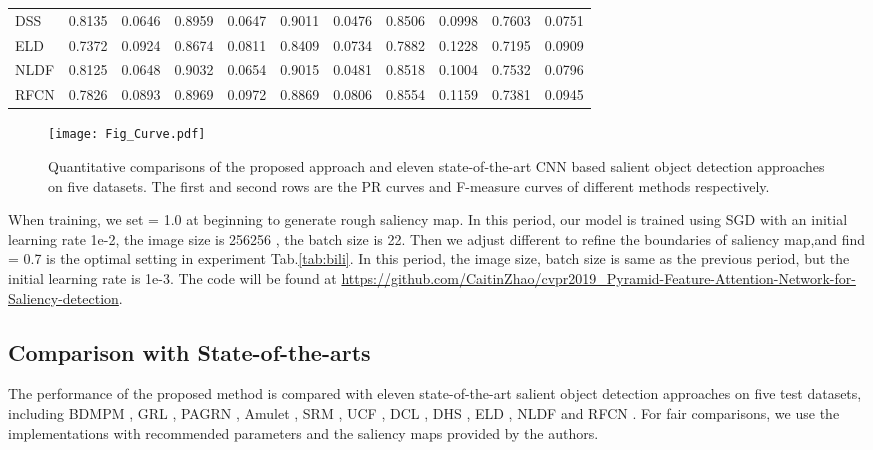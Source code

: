 \documentclass[10pt,twocolumn,letterpaper]{article}
\begin{document}
\begin{center}
\begin{table*}[t]
\begin{tabular}{| l | c | c | c | c | c | c | c | c | c | c |}
DSS\cite{dss}     & 0.8135 & 0.0646 & 0.8959 & 0.0647 & 0.9011 & 0.0476 & 0.8506 & 0.0998 & 0.7603 & 0.0751 \\
ELD\cite{eld}     & 0.7372 & 0.0924 & 0.8674 & 0.0811 & 0.8409 & 0.0734 & 0.7882 & 0.1228 & 0.7195 & 0.0909 \\
NLDF\cite{nldf}    & 0.8125 & 0.0648 & 0.9032 & 0.0654 & 0.9015 & 0.0481 & 0.8518 & 0.1004 & 0.7532 & 0.0796 \\
RFCN\cite{rfcn}    & 0.7826 & 0.0893 & 0.8969 & 0.0972 & 0.8869 & 0.0806 & 0.8554 & 0.1159 & 0.7381 & 0.0945 \\\hline
\end{tabular}
\label{tab:all_comparison}
\end{table*}

\end{center}

\begin{figure*}[t]
\centering
\texttt{[image: Fig\_Curve.pdf]}
\caption{ Quantitative comparisons of the proposed approach and eleven state-of-the-art CNN based salient object detection approaches on five datasets. The first and second rows are the PR curves and F-measure curves of different methods respectively.}
\label{fig:Quantitative_Comparison}
\end{figure*}

When training, we set  = 1.0 at beginning to generate rough saliency map. In this period, our model is trained using SGD\cite{sgd} with an initial learning rate 1e-2, the image size is 256256 , the batch size is 22. Then we adjust different   to refine the boundaries of saliency map,and find  = 0.7 is the optimal setting in experiment Tab.\ref {tab:bili}. In this period, the image size, batch size is same as the previous period, but the initial learning rate is 1e-3. The code will be found at \url{https://github.com/CaitinZhao/cvpr2019_Pyramid-Feature-Attention-Network-for-Saliency-detection}.


\subsection{Comparison with State-of-the-arts}
The performance of the proposed method is compared with eleven state-of-the-art salient object detection approaches on five test datasets, including BDMPM \cite{bdmpm}, GRL \cite{grl}, PAGRN \cite{pagrn}, Amulet \cite{amulet}, SRM \cite{srm}, UCF \cite{ucf}, DCL \cite{dcl}, DHS \cite{dhs}, ELD \cite{eld}, NLDF \cite{nldf} and RFCN \cite{rfcn}. For fair comparisons, we use the implementations with recommended parameters and the saliency maps provided by the authors.
\end{document}
